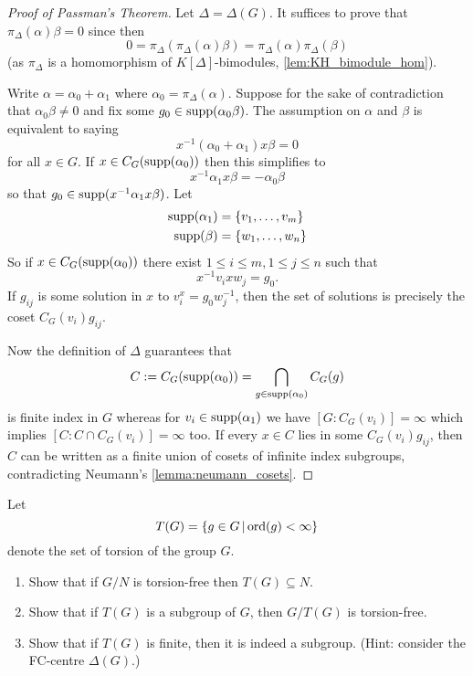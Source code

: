 \begin{proof}[Proof of Passman's Theorem]
    Let $\Delta = \Delta(G)$.
    It suffices to prove that $\pi_\Delta(\alpha) \beta = 0$ since then \[
        0 = \pi_\Delta\left( \pi_\Delta(\alpha) \beta \right) = \pi_\Delta(\alpha) \pi_\Delta(\beta)
    \] (as $\pi_\Delta$ is a homomorphism of $K[\Delta]$-bimodules, \cref{lem:KH_bimodule_hom}).

    Write $\alpha = \alpha_0 + \alpha_1$ where $\alpha_0 = \pi_\Delta(\alpha)$.
    Suppose for the sake of contradiction that $\alpha_0 \beta \neq 0$ and fix some $g_0 \in \operatorname{supp}(\alpha_0 \beta)$.
    The assumption on $\alpha$ and $\beta$ is equivalent to saying \[
        x^{-1} (\alpha_0 + \alpha_1) x \beta = 0
    \] for all $x \in G$.
    If $x \in C_G(\operatorname{supp}(\alpha_0))$ then this simplifies to \[
        x^{-1} \alpha_1 x \beta = - \alpha_0 \beta
    \] so that $g_0 \in \operatorname{supp}(x^{-1} \alpha_1 x \beta)$.
    Let
    \begin{align*}
        \operatorname{supp}(\alpha_1) &= \{ v_1, \dots, v_m \} \\
        \operatorname{supp}(\beta) &= \{ w_1, \dots, w_n \}
    \end{align*}
    So if $x \in C_G(\operatorname{supp}(\alpha_0))$ there exist $1 \leq i \leq m, 1 \leq j \leq n$ such that \[
        x^{-1} v_i x w_j = g_0.
    \]
    If $g_{ij}$ is some solution in $x$ to $v_i^x = g_0 w_j^{-1}$, then the set of solutions is precisely the coset $C_G(v_i) g_{ij}$.

    Now the definition of $\Delta$ guarantees that \[
        C := C_G(\operatorname{supp}(\alpha_0)) = \bigcap_{g \in \operatorname{supp}(\alpha_0)} C_G(g)
    \] is finite index in $G$ whereas for $v_i \in \operatorname{supp}(\alpha_1)$ we have $[G : C_G(v_i)] = \infty$ which implies $[C : C \cap C_G(v_i)] = \infty$ too.
    If every $x \in C$ lies in some $C_G(v_i) g_{ij}$, then $C$ can be written as a finite union of cosets of infinite index subgroups, contradicting Neumann's \cref{lemma:neumann_cosets}.

\end{proof}

\begin{exercise}
    Let \[
        T(G) = \left\{ g \in G \,\middle|\, \operatorname{ord}(g) < \infty \right\}
    \] denote the set of torsion of the group $G$.
    \begin{enumerate}
        \item Show that if $G / N$ is torsion-free then $T(G) \subseteq N$.
        \item Show that if $T(G)$ is a subgroup of $G$, then $G / T(G)$ is torsion-free.
        \item Show that if $T(G)$ is finite, then it is indeed a subgroup. (Hint: consider the FC-centre $\Delta(G)$.)
    \end{enumerate}
\end{exercise}

